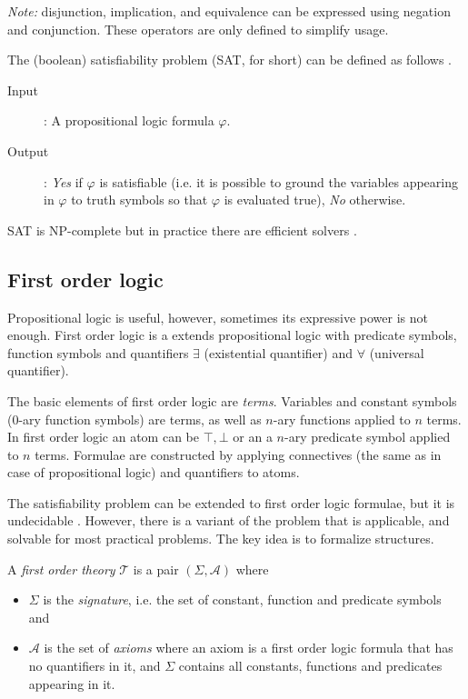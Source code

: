 \emph{Note:} disjunction, implication, and equivalence can be expressed using negation and conjunction. These operators are only defined to simplify usage.

The (boolean) satisfiability problem (SAT, for short) can be defined as follows \cite{biere2009handbook}.
\begin{description}
	\item[Input]: A propositional logic formula $\varphi$.
	\item[Output]: \emph{Yes} if $\varphi$ is satisfiable (i.e. it is possible to ground the variables appearing in $\varphi$ to truth symbols so that $\varphi$ is evaluated true), \emph{No} otherwise.
\end{description}

SAT is NP-complete \cite{Cook71} but in practice there are efficient solvers \cite{oai:hal.archives-ouvertes.fr:hal-00868244}.

\subsection{First order logic}

Propositional logic is useful, however, sometimes its expressive power is not enough. First order logic is a extends propositional logic with predicate symbols, function symbols and quantifiers $\exists$ (existential quantifier) and $\forall$ (universal quantifier). 


The basic elements of first order logic are \emph{terms}. Variables and constant symbols (0-ary function symbols) are terms, as well as $n$-ary functions applied to $n$ terms. In first order logic an atom can be $\top, \bot$ or an a $n$-ary predicate symbol applied to $n$ terms. Formulae are constructed by applying connectives (the same as in case of propositional logic) and quantifiers to atoms.

The satisfiability problem can be extended to first order logic formulae, but it is undecidable \cite{Church36a,Turing36}. However, there is a variant of the problem that is applicable, and solvable for most practical problems. The key idea is to formalize structures.

\begin{dfn}
	A \emph{first order theory} $\mathcal{T}$ is a pair $(\Sigma,\mathcal{A})$ \cite{books/daglib/0019162} where 
	\begin{itemize}
		\item $\Sigma$ is the \emph{signature}, i.e. the set of constant, function and predicate symbols and
		\item $\mathcal{A}$ is the set of \emph{axioms} where an axiom is a first order logic formula that has no quantifiers in it, and $\Sigma$ contains all constants, functions and predicates appearing in it.
	\end{itemize}
\end{dfn}

